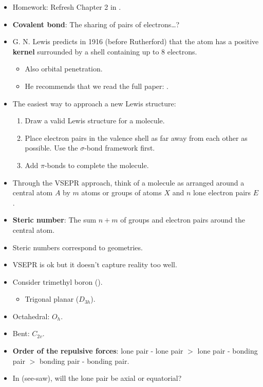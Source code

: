 \documentclass[../main.tex]{subfiles}
\begin{document}
\begin{itemize}
\begin{itemize}
    \end{itemize}
    \item Homework: Refresh Chapter 2 in \textcite{bib:MiesslerFischerTarr}.
    \item \textbf{Covalent bond}: The sharing of pairs of electrons\dots?
    \item G. N. Lewis predicts in 1916 (before Rutherford) that the atom has a positive \textbf{kernel} surrounded by a shell containing up to 8 electrons.
    \begin{itemize}
        \item Also orbital penetration.
        \item He recommends that we read the full paper: \textcite{bib:Lewis}.
    \end{itemize}
    \item The easiest way to approach a new Lewis structure:
    \begin{enumerate}
        \item Draw a valid Lewis structure for a molecule.
        \item Place electron pairs in the valence shell as far away from each other as possible. Use the $\sigma$-bond framework first.
        \item Add $\pi$-bonds to complete the molecule.
    \end{enumerate}
    \item Through the VSEPR approach, think of a molecule as arranged around a central atom $A$ by $m$ atoms or groups of atoms $X$ and $n$ lone electron pairs $E$.
    \item \textbf{Steric number}: The sum $n+m$ of groups and electron pairs around the central atom.
    \item Steric numbers correspond to geometries.
    \item VSEPR is ok but it doesn't capture reality too well.
    \item Consider trimethyl boron ().
    \begin{itemize}
        \item Trigonal planar ($D_{3h}$).
    \end{itemize}
    \item Octahedral: $O_h$.
    \item Bent: $C_{2v}$.
    \item \textbf{Order of the repulsive forces}: lone pair - lone pair $>$ lone pair - bonding pair $>$ bonding pair - bonding pair.
    \item In  (see-saw), will the lone pair be axial or equatorial?

\end{itemize}
\end{document}
